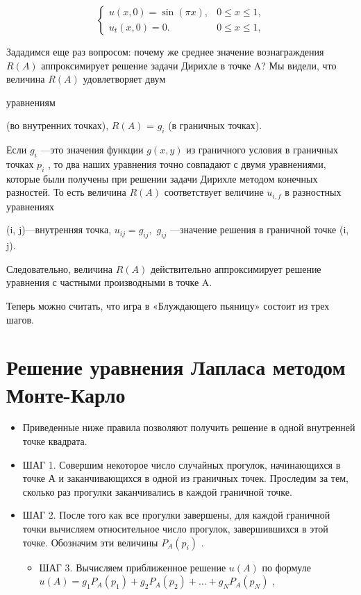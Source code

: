 \documentclass[
  ukrainian,
]{article}
\providecommand{\tightlist}{%
  \setlength{\itemsep}{0pt}\setlength{\parskip}{0pt}}
\begin{document}
\[
\begin{cases} u(x, 0) = \sin(\pi x), & 0 \le x \le 1, \\ u_t(x, 0) = 0. & 0 \le x \le 1, \end{cases}
\]

Зададимся еще раз вопросом: почему же среднее значение вознаграждения
\(R(A)\) аппроксимирует решение задачи Дирихле в точке A? Мы видели, что
величина \(R(A)\) удовлетворяет двум

уравнениям

(во внутренних точках), \(R(A)\) = \(g_i\) (в граничных точках).

Если \(g_i\) ---это значения функции \(g(x, y)\) из граничного условия в
граничных точках \(p_i\) , то два наших уравнения точно совпадают с
двумя уравнениями, которые были получены при решении задачи Дирихле
методом конечных разностей. То есть величина \(R(A)\) соответствует
величине \(u_{i,f}\) в разностных уравнениях

(i, j)---внутренняя точка, \(u_{ij} = g_{ij},\) \(g_{ij}\) ---значение
решения в граничной точке (i, j).

Следовательно, величина \(R(A)\) действительно аппроксимирует решение
уравнения с частными производными в точке A.

Теперь можно считать, что игра в «Блуждающего пьяницу» состоит из трех
шагов.

\section{Решение уравнения Лапласа методом
Монте-Карло}\label{ux440ux435ux448ux435ux43dux438ux435-ux443ux440ux430ux432ux43dux435ux43dux438ux44f-ux43bux430ux43fux43bux430ux441ux430-ux43cux435ux442ux43eux434ux43eux43c-ux43cux43eux43dux442ux435-ux43aux430ux440ux43bux43e}

\begin{itemize}
\tightlist
\item
  Приведенные ниже правила позволяют получить решение в одной внутренней
  точке квадрата.
\item
  ШАГ 1. Совершим некоторое число случайных прогулок, начинающихся в
  точке А и заканчивающихся в одной из граничных точек. Проследим за
  тем, сколько раз прогулки заканчивались в каждой граничной точке.
\item
  ШАГ 2. После того как все прогулки завершены, для каждой граничной
  точки вычисляем относительное число прогулок, завершившихся в этой
  точке. Обозначим эти величины \(P_A(p_i)\) .

  \begin{itemize}
  \tightlist
  \item
    ШАГ 3. Вычисляем приближенное решение \(u(A)\) по формуле
    \(u(A) = g_1 P_A(p_1) + g_2 P_A(p_2) + \dots + g_N P_A(p_N)\) ,
  \end{itemize}
\end{itemize}
\end{document}
